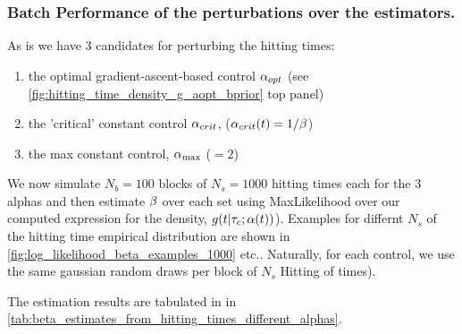 \subsubsection{Batch Performance of the perturbations over the estimators.}
As is we have 3 candidates for perturbing the hitting times: 
\begin{enumerate}
  \item 
the optimal gradient-ascent-based  control $\alpha_{opt}$ (see
\cref{fig:hitting_time_density_g_aopt_bprior} top panel)
\item   the 'critical' constant control
$\alpha_{crit}$, ($\alpha_{crit}(t) = 1/\beta$)
\item  the max constant control, ${ \alpha_{\textrm{max}} }$ ($=2$)
\end{enumerate} 

We now simulate $N_b = 100$ blocks of $N_s=1000$ hitting times each for the
3 alphas and then estimate $\beta$ over each set using MaxLikelihood over our
computed expression for the density, $g(t|{ \tau_{c} }; \alpha(t) )$). Examples for
differnt $N_s$ of the hitting time empirical
distribution are shown in \cref{fig:log_likelihood_beta_examples_1000} etc..
Naturally, for each control, we use the same gaussian random draws per block of $N_s$ Hitting of times).

The estimation results are tabulated in in
\cref{tab:beta_estimates_from_hitting_times_different_alphas}.

